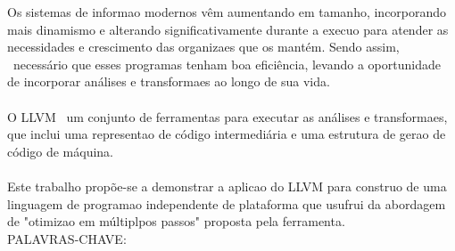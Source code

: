 
\begin{resumo}
\label{tcc:resumo}
\noindent
Os sistemas de informa\ca o modernos v\^em aumentando em tamanho, incorporando mais dinamismo e alterando significativamente durante a execu\ca o para atender as necessidades e crescimento das organiza\co es que os mant\'em. Sendo assim, \eh\ necess\'ario que esses programas tenham boa efici\^encia, levando a oportunidade de incorporar an\'alises e transforma\co es ao longo de sua vida.\\\\
O LLVM \eh\ um conjunto de ferramentas para executar as an\'alises e transforma\co es, que inclui uma representa\ca o de c\'odigo intermedi\'aria e uma estrutura de gera\ca o de c\'odigo de m\'aquina.\\\\
Este trabalho prop\~oe-se a demonstrar a aplica\ca o do LLVM para constru\ca o de uma linguagem de programa\ca o independente de plataforma que usufrui da abordagem de "otimiza\ca o em m\'ultiplpos passos" proposta pela ferramenta.\\[1.5cm]
PALAVRAS-CHAVE: \Keywords
\end{resumo}
